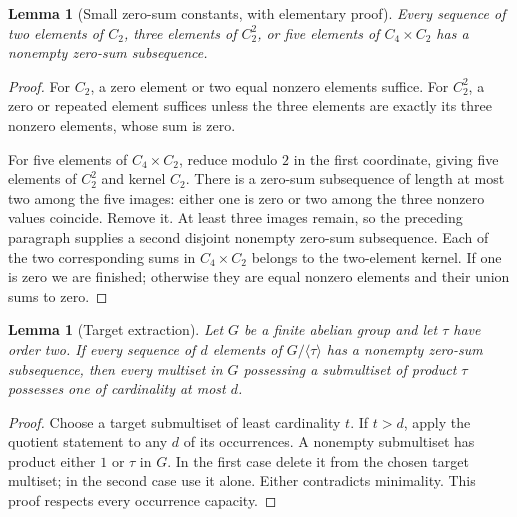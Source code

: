 \documentclass[11pt]{article}
\newtheorem{lemma}[theorem]{Lemma}
\theoremstyle{remark}\newtheorem{remark}[theorem]{Remark}
\begin{document}
\begin{lemma}[Small zero-sum constants, with elementary proof]\label{lem:zero}
Every sequence of two elements of $C_2$, three elements of $C_2^2$, or five elements of $C_4\times C_2$ has a nonempty zero-sum subsequence.
\end{lemma}
\begin{proof}
For $C_2$, a zero element or two equal nonzero elements suffice. For $C_2^2$, a zero or repeated element suffices unless the three elements are exactly its three nonzero elements, whose sum is zero.

For five elements of $C_4\times C_2$, reduce modulo $2$ in the first coordinate, giving five elements of $C_2^2$ and kernel $C_2$. There is a zero-sum subsequence of length at most two among the five images: either one is zero or two among the three nonzero values coincide. Remove it. At least three images remain, so the preceding paragraph supplies a second disjoint nonempty zero-sum subsequence. Each of the two corresponding sums in $C_4\times C_2$ belongs to the two-element kernel. If one is zero we are finished; otherwise they are equal nonzero elements and their union sums to zero.
\end{proof}

\begin{lemma}[Target extraction]\label{lem:extract}
Let $G$ be a finite abelian group and let $\tau$ have order two. If every sequence of $d$ elements of $G/\langle\tau\rangle$ has a nonempty zero-sum subsequence, then every multiset in $G$ possessing a submultiset of product $\tau$ possesses one of cardinality at most $d$.
\end{lemma}
\begin{proof}
Choose a target submultiset of least cardinality $t$. If $t>d$, apply the quotient statement to any $d$ of its occurrences. A nonempty submultiset has product either $1$ or $\tau$ in $G$. In the first case delete it from the chosen target multiset; in the second case use it alone. Either contradicts minimality. This proof respects every occurrence capacity.
\end{proof}
\end{document}
